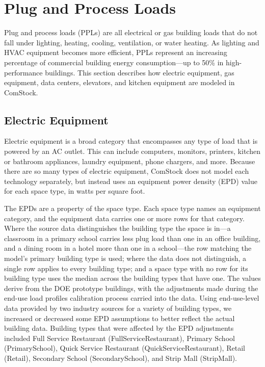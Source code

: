 \section{Plug and Process Loads}
\label{sec:plug_and_process_loads}

Plug and process loads (PPLs) are all electrical or gas building loads that do not fall under lighting, heating, cooling, ventilation, or water heating. As lighting and HVAC equipment becomes more efficient, PPLs represent an increasing percentage of commercial building energy consumption---up to 50\% in high-performance buildings. This section describes how electric equipment, gas equipment, data centers, elevators, and kitchen equipment are modeled in ComStock. 

\subsection{Electric Equipment}

Electric equipment is a broad category that encompasses any type of load that is powered by an AC outlet. This can include computers, monitors, printers, kitchen or bathroom appliances, laundry equipment, phone chargers, and more. Because there are so many types of electric equipment, ComStock does not model each technology separately, but instead uses an equipment power density (EPD) value for each space type, in watts per square foot. 

The EPDs are a property of the space type. Each space type names an equipment category, and the equipment data carries one or more rows for that category. Where the source data distinguishes the building type the space is in---a classroom in a primary school carries less plug load than one in an office building, and a dining room in a hotel more than one in a school---the row matching the model's primary building type is used; where the data does not distinguish, a single row applies to every building type; and a space type with no row for its building type uses the median across the building types that have one. The values derive from the DOE prototype buildings, with the adjustments made during the end-use load profiles calibration process carried into the data. Using end-use-level data provided by two industry sources for a variety of building types, we increased or decreased some EPD assumptions to better reflect the actual building data. Building types that were affected by the EPD adjustments included Full Service Restaurant (FullServiceRestaurant), Primary School (PrimarySchool), Quick Service Restaurant (QuickServiceRestaurant), Retail (Retail), Secondary School (SecondarySchool), and Strip Mall (StripMall).

